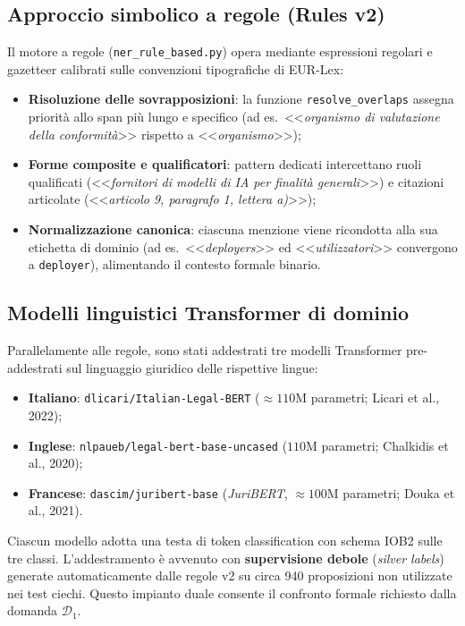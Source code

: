\documentclass[12pt,a4paper,oneside]{report}
\begin{document}
\subsection{Approccio simbolico a regole (Rules v2)}
Il motore a regole (\texttt{ner\_rule\_based.py}) opera mediante espressioni regolari e gazetteer calibrati sulle convenzioni tipografiche di EUR-Lex:
\begin{itemize}
    \item \textbf{Risoluzione delle sovrapposizioni}: la funzione \texttt{resolve\_overlaps} assegna priorità allo span più lungo e specifico (ad es.\ <<\emph{organismo di valutazione della conformità}>> rispetto a <<\emph{organismo}>>);
    \item \textbf{Forme composite e qualificatori}: pattern dedicati intercettano ruoli qualificati (<<\emph{fornitori di modelli di IA per finalità generali}>>) e citazioni articolate (<<\emph{articolo 9, paragrafo 1, lettera a)}>>);
    \item \textbf{Normalizzazione canonica}: ciascuna menzione viene ricondotta alla sua etichetta di dominio (ad es.\ <<\emph{deployers}>> ed <<\emph{utilizzatori}>> convergono a \texttt{deployer}), alimentando il contesto formale binario.
\end{itemize}

\subsection{Modelli linguistici Transformer di dominio}
Parallelamente alle regole, sono stati addestrati tre modelli Transformer pre-addestrati sul linguaggio giuridico delle rispettive lingue:
\begin{itemize}
    \item \textbf{Italiano}: \texttt{dlicari/Italian-Legal-BERT} ($\approx 110\text{M}$ parametri; Licari et al., 2022);
    \item \textbf{Inglese}: \texttt{nlpaueb/legal-bert-base-uncased} ($110\text{M}$ parametri; Chalkidis et al., 2020);
    \item \textbf{Francese}: \texttt{dascim/juribert-base} (\emph{JuriBERT}, $\approx 100\text{M}$ parametri; Douka et al., 2021).
\end{itemize}

Ciascun modello adotta una testa di token classification con schema IOB2 sulle tre classi. L'addestramento è avvenuto con \textbf{supervisione debole} (\emph{silver labels}) generate automaticamente dalle regole v2 su circa 940 proposizioni non utilizzate nei test ciechi. Questo impianto duale consente il confronto formale richiesto dalla domanda $\mathcal{D}_1$.
\end{document}

